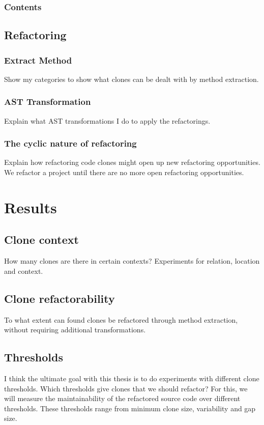 \documentclass[conference]{IEEEtran}
\begin{document}
\subsubsection{Contents}

\subsection{Refactoring}
\subsubsection{Extract Method}
Show my categories to show what clones can be dealt with by method extraction.

\subsubsection{AST Transformation}
Explain what AST transformations I do to apply the refactorings.

\subsubsection{The cyclic nature of refactoring}
Explain how refactoring code clones might open up new refactoring opportunities. We refactor a project until there are no more open refactoring opportunities.

\section{Results}

\subsection{Clone context}
How many clones are there in certain contexts? Experiments for relation, location and context.

\subsection{Clone refactorability}
To what extent can found clones be refactored through method extraction, without requiring additional transformations.

\subsection{Thresholds}
I think the ultimate goal with this thesis is to do experiments with different clone thresholds. Which thresholds give clones that we should refactor? For this, we will measure the maintainability of the refactored source code over different thresholds. These thresholds range from minimum clone size, variability and gap size.
\end{document}
